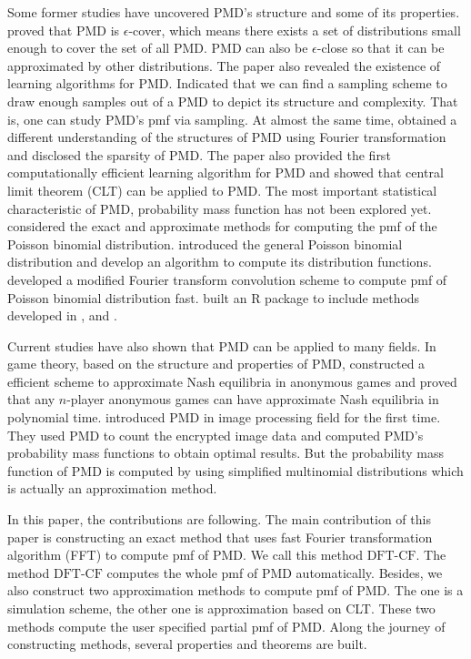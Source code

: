 \documentclass[12pt]{article}
\newcommand{\PMD}{\textrm{PMD}}
\newcommand{\dft}{{\textrm{DFT-CF}}}
\begin{document}
Some former studies have uncovered $\PMD$'s structure and some of its properties.  proved that $\PMD$ is $\epsilon$-cover, which means there exists a set of distributions small enough to cover the set of all $\PMD$. $\PMD$ can also be $\epsilon$-close so that it can be approximated by other distributions. The paper also revealed the existence of learning algorithms for $\PMD$. Indicated that we can find a sampling scheme to draw enough samples out of a $\PMD$ to depict its structure and complexity. That is, one can study $\PMD$'s pmf via sampling. At almost the same time,  obtained a different understanding of the structures of $\PMD$ using Fourier transformation and disclosed the sparsity of $\PMD$. The paper also provided the first computationally efficient learning algorithm for $\PMD$ and showed that central limit theorem (CLT) can be applied to $\PMD$. The most important statistical characteristic of $\PMD$, probability mass function has not been explored yet.  considered the exact and approximate methods for computing the pmf of the Poisson binomial distribution.  introduced the general Poisson binomial distribution and develop an algorithm to compute its distribution functions.  developed a modified Fourier transform convolution scheme to compute pmf of Poisson binomial distribution fast.  built an R package to include methods developed in ,  and .

Current studies have also shown that $\PMD$ can be applied to many fields. In game theory, based on the structure and properties of $\PMD$,  constructed a efficient scheme to approximate Nash equilibria in anonymous games and  proved that any $n$-player anonymous games can have approximate Nash equilibria in polynomial time.  introduced $\PMD$ in image processing field for the first time. They used $\PMD$ to count the encrypted image data and computed $\PMD$'s probability mass functions to obtain optimal results. But the probability mass function of $\PMD$ is computed by using simplified multinomial distributions which is actually an approximation method.

In this paper, the contributions are following. The main contribution of this paper is constructing an exact method that uses fast Fourier transformation algorithm (FFT) to compute pmf of $\PMD$.  We call this method $\dft$. The method $\dft$ computes the whole pmf of $\PMD$ automatically. Besides, we also construct two approximation methods to compute pmf of $\PMD$. The one is a simulation scheme, the other one is approximation based on CLT. These two methods compute the user specified partial pmf of $\PMD$. Along the journey of constructing methods, several properties and theorems are built.
\end{document}
